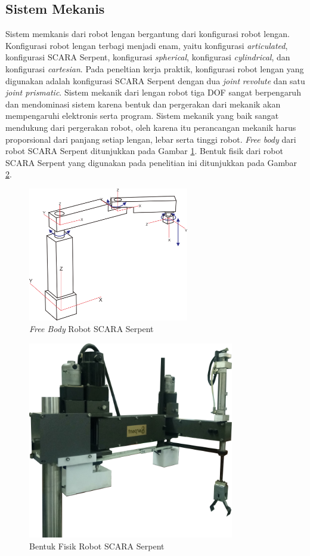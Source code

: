 \subsection{ Sistem Mekanis }
Sistem memkanis dari robot lengan bergantung dari konfigurasi robot lengan. Konfigurasi robot lengan terbagi menjadi enam, yaitu konfigurasi \textit{articulated}, konfigurasi SCARA Serpent, konfigurasi \textit{spherical}, konfigurasi \textit{cylindrical}, dan konfigurasi \textit{cartesian}. Pada peneltian kerja praktik, konfigurasi robot lengan yang digunakan adalah konfigurasi SCARA Serpent dengan dua \textit{joint} \textit{revolute} dan satu \textit{joint prismatic}. Sistem mekanik dari lengan robot tiga DOF sangat berpengaruh dan mendominasi sistem karena bentuk dan pergerakan dari mekanik akan mempengaruhi elektronis serta program. Sistem mekanik yang baik sangat mendukung dari pergerakan robot, oleh karena itu perancangan mekanik harus proporsional dari panjang setiap lengan, lebar serta tinggi robot. \textit{Free body} dari robot SCARA Serpent ditunjukkan pada Gambar \ref{pic.freebodySCARA}. Bentuk fisik dari robot SCARA Serpent yang digunakan pada penelitian ini ditunjukkan pada Gambar \ref{pic.fisikSCARA}. 
\begin{figure}[H]
	\centering
	\includegraphics[width=7cm]{gambar/SCARAA.png}
	\caption{\textit{Free Body} Robot SCARA Serpent}
	\label{pic.freebodySCARA}
\end{figure}
\begin{figure}[H]
	\centering
	\includegraphics[width=9cm]{gambar/3dSCARA.png}
	\caption{Bentuk Fisik Robot SCARA Serpent}
	\label{pic.fisikSCARA}
\end{figure}
